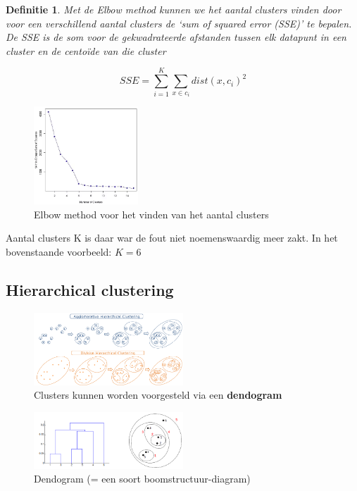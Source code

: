 \documentclass{article}
\newtheorem{theorem}{Definitie}[section]
\begin{document}
\begin{theorem}
    Met de Elbow method kunnen we het aantal clusters vinden door voor een verschillend aantal
    clusters de `sum of squared error (SSE)' te bepalen. De SSE is de som voor de gekwadrateerde
    afstanden tussen elk datapunt in een cluster en de centoïde van die cluster
\end{theorem}

\begin{equation}
    SSE = \sum_{i=1}^K \sum_{x \in c_i} dist(x, c_i)^2
\end{equation}

\begin{figure}[H]
    \centering
    \includegraphics[width=0.35\textwidth]{k-means-elbow.png}
    \caption{Elbow method voor het vinden van het aantal clusters}
\end{figure}

Aantal clusters K is daar war de fout niet noemenswaardig meer zakt. In het bovenstaande voorbeeld: $K=6$

\subsection{Hierarchical clustering}

\begin{figure}[H]
    \centering
    \includegraphics[width=0.5\textwidth]{clustering-hierarchical.png}
    \caption{Clusters kunnen worden voorgesteld via een \textbf{dendogram}}
\end{figure}

\begin{figure}[H]
    \centering
    \includegraphics[width=0.5\textwidth]{dendogram.png}
    \caption{Dendogram (= een soort boomstructuur-diagram)}
\end{figure}
\end{document}
